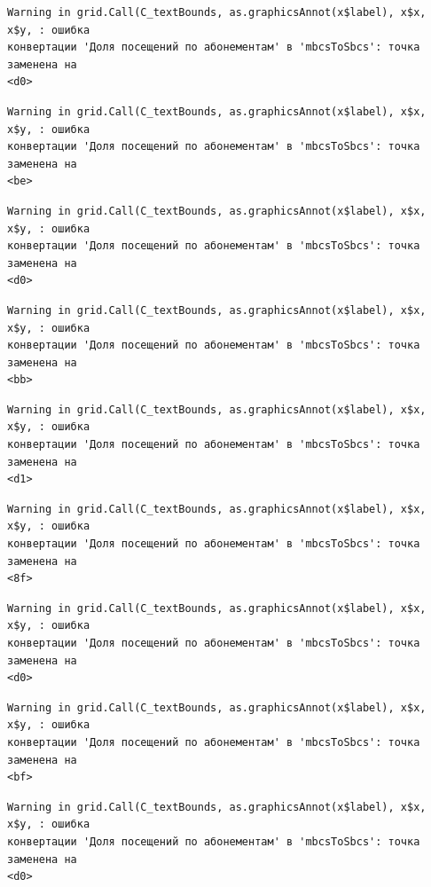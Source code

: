 \documentclass[
  letterpaper,
  DIV=11,
  numbers=noendperiod]{scrreprt}
\begin{document}
\begin{verbatim}
Warning in grid.Call(C_textBounds, as.graphicsAnnot(x$label), x$x, x$y, : ошибка
конвертации 'Доля посещений по абонементам' в 'mbcsToSbcs': точка заменена на
<d0>
\end{verbatim}

\begin{verbatim}
Warning in grid.Call(C_textBounds, as.graphicsAnnot(x$label), x$x, x$y, : ошибка
конвертации 'Доля посещений по абонементам' в 'mbcsToSbcs': точка заменена на
<be>
\end{verbatim}

\begin{verbatim}
Warning in grid.Call(C_textBounds, as.graphicsAnnot(x$label), x$x, x$y, : ошибка
конвертации 'Доля посещений по абонементам' в 'mbcsToSbcs': точка заменена на
<d0>
\end{verbatim}

\begin{verbatim}
Warning in grid.Call(C_textBounds, as.graphicsAnnot(x$label), x$x, x$y, : ошибка
конвертации 'Доля посещений по абонементам' в 'mbcsToSbcs': точка заменена на
<bb>
\end{verbatim}

\begin{verbatim}
Warning in grid.Call(C_textBounds, as.graphicsAnnot(x$label), x$x, x$y, : ошибка
конвертации 'Доля посещений по абонементам' в 'mbcsToSbcs': точка заменена на
<d1>
\end{verbatim}

\begin{verbatim}
Warning in grid.Call(C_textBounds, as.graphicsAnnot(x$label), x$x, x$y, : ошибка
конвертации 'Доля посещений по абонементам' в 'mbcsToSbcs': точка заменена на
<8f>
\end{verbatim}

\begin{verbatim}
Warning in grid.Call(C_textBounds, as.graphicsAnnot(x$label), x$x, x$y, : ошибка
конвертации 'Доля посещений по абонементам' в 'mbcsToSbcs': точка заменена на
<d0>
\end{verbatim}

\begin{verbatim}
Warning in grid.Call(C_textBounds, as.graphicsAnnot(x$label), x$x, x$y, : ошибка
конвертации 'Доля посещений по абонементам' в 'mbcsToSbcs': точка заменена на
<bf>
\end{verbatim}

\begin{verbatim}
Warning in grid.Call(C_textBounds, as.graphicsAnnot(x$label), x$x, x$y, : ошибка
конвертации 'Доля посещений по абонементам' в 'mbcsToSbcs': точка заменена на
<d0>
\end{verbatim}
\end{document}
